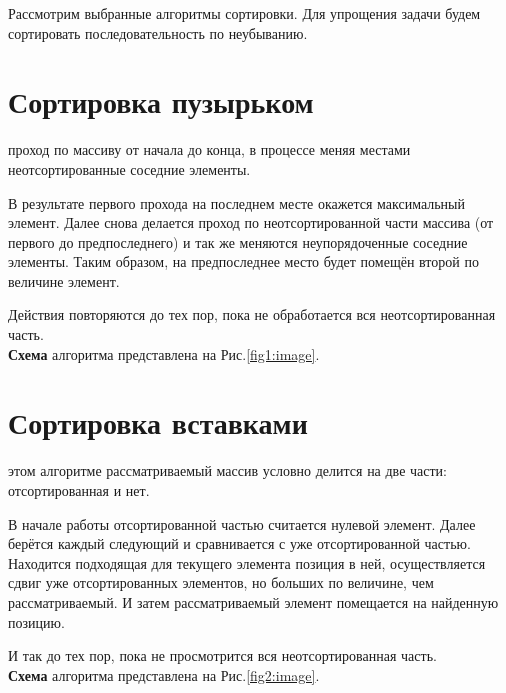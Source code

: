 Рассмотрим выбранные алгоритмы сортировки. Для упрощения задачи будем сортировать последовательность по неубыванию. 
\section{Сортировка пузырьком}
 проход по массиву от начала до конца, в процессе меняя местами неотсортированные соседние элементы.

В результате первого прохода на последнем месте окажется максимальный элемент. Далее снова делается проход по неотсортированной части массива (от первого до предпоследнего) и так же меняются неупорядоченные соседние элементы. Таким образом, на предпоследнее место будет помещён второй по величине элемент.

Действия повторяются до тех пор, пока не обработается вся неотсортированная часть. \\

\textbf{Схема} алгоритма представлена на Рис.\ref{fig1:image}.

\section{Сортировка вставками}
 этом алгоритме рассматриваемый массив условно делится на две части: отсортированная и нет. 

В начале работы отсортированной частью считается нулевой элемент. Далее берётся каждый следующий и сравнивается с уже отсортированной частью. Находится подходящая для текущего элемента позиция в ней, осуществляется сдвиг уже отсортированных элементов, но больших по величине, чем рассматриваемый. И затем рассматриваемый элемент помещается на найденную позицию.

И так до тех пор, пока не просмотрится вся неотсортированная часть.\\ 

\textbf{Схема} алгоритма представлена на Рис.\ref{fig2:image}.
